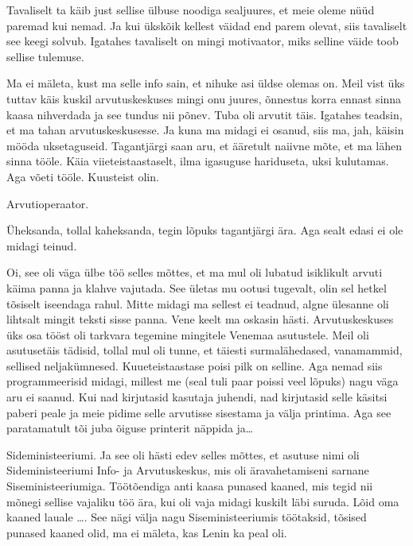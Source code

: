 Tavaliselt ta käib just sellise ülbuse noodiga sealjuures, et meie oleme nüüd 
paremad kui nemad. Ja kui ükskõik kellest väidad end parem olevat, siis 
tavaliselt see keegi solvub. Igatahes tavaliselt on mingi motivaator, miks 
selline väide toob sellise tulemuse. 


Ma ei mäleta, kust ma selle info sain, et nihuke asi üldse olemas on. Meil vist 
üks tuttav käis kuskil arvutuskeskuses  mingi onu juures, õnnestus korra ennast 
sinna kaasa nihverdada ja see tundus nii põnev. Tuba oli arvutit täis. Igatahes 
teadsin, et ma tahan arvutuskeskusesse. Ja kuna ma midagi ei osanud, siis ma, 
jah, käisin mööda  uksetaguseid. Tagantjärgi saan aru, et ääretult naiivne 
mõte, et ma lähen sinna tööle. Käia viieteistaastaselt, ilma igasuguse 
hariduseta, uksi kulutamas. Aga võeti tööle. Kuusteist olin.


Arvutioperaator. 


Üheksanda, tollal kaheksanda, tegin lõpuks tagantjärgi ära. Aga sealt edasi ei 
ole midagi teinud. 


Oi, see oli väga ülbe töö selles mõttes, et ma mul oli lubatud isiklikult 
arvuti käima panna ja klahve vajutada. See ületas mu ootusi tugevalt, olin sel 
hetkel tõsiselt iseendaga rahul. Mitte midagi ma sellest ei teadnud, algne 
ülesanne oli lihtsalt mingit teksti sisse panna. Vene keelt ma oskasin hästi. 
Arvutuskeskuses üks osa tööst oli  tarkvara tegemine mingitele Venemaa 
asutustele. Meil oli asutusetäis tädisid, tollal mul oli tunne, et täiesti 
surmalähedased, vanamammid, sellised neljakümnesed. Kuueteistaastase poisi pilk 
on selline. Aga nemad siis programmeerisid  midagi, millest me (seal tuli paar 
poissi veel lõpuks)  nagu väga aru ei saanud. Kui nad kirjutasid kasutaja 
juhendi, nad kirjutasid selle käsitsi paberi peale ja meie pidime selle 
arvutisse sisestama ja välja printima. Aga see paratamatult tõi juba õiguse 
printerit näppida ja\ldots


Sideministeeriumi. Ja see oli hästi edev selles mõttes, et asutuse nimi oli 
Sideministeeriumi Info- ja Arvutuskeskus, mis oli äravahetamiseni sarnane Siseministeeriumiga. 
Töötõendiga anti kaasa punased kaaned, mis tegid nii mõnegi sellise vajaliku 
töö ära, kui oli vaja midagi kuskilt läbi suruda. Lõid oma kaaned lauale 
\ldots. See nägi välja nagu Siseministeeriumis töötaksid, tõsised punased 
kaaned olid, ma ei mäleta, kas Lenin ka peal oli. 

